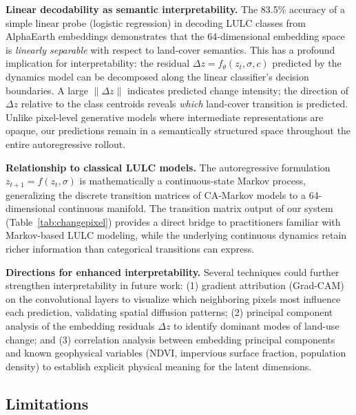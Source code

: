 \documentclass{article}
\begin{document}
\textbf{Linear decodability as semantic interpretability.}
The 83.5\% accuracy of a simple linear probe (logistic regression) in decoding LULC classes from AlphaEarth embeddings \citep{rahman2026interpretable} demonstrates that the 64-dimensional embedding space is \textit{linearly separable} with respect to land-cover semantics. This has a profound implication for interpretability: the residual $\Delta z = f_\theta(z_t, \sigma, c)$ predicted by the dynamics model can be decomposed along the linear classifier's decision boundaries. A large $\|\Delta z\|$ indicates predicted change intensity; the direction of $\Delta z$ relative to the class centroids reveals \textit{which} land-cover transition is predicted. Unlike pixel-level generative models where intermediate representations are opaque, our predictions remain in a semantically structured space throughout the entire autoregressive rollout.

\textbf{Relationship to classical LULC models.}
The autoregressive formulation $z_{t+1} = f(z_t, \sigma)$ is mathematically a continuous-state Markov process, generalizing the discrete transition matrices of CA-Markov models to a 64-dimensional continuous manifold. The transition matrix output of our system (Table~\ref{tab:changepixel}) provides a direct bridge to practitioners familiar with Markov-based LULC modeling, while the underlying continuous dynamics retain richer information than categorical transitions can express.

\textbf{Directions for enhanced interpretability.}
Several techniques could further strengthen interpretability in future work: (1) gradient attribution (Grad-CAM) on the convolutional layers to visualize which neighboring pixels most influence each prediction, validating spatial diffusion patterns; (2) principal component analysis of the embedding residuals $\Delta z$ to identify dominant modes of land-use change; and (3) correlation analysis between embedding principal components and known geophysical variables (NDVI, impervious surface fraction, population density) to establish explicit physical meaning for the latent dimensions.

\subsection{Limitations}
\end{document}
